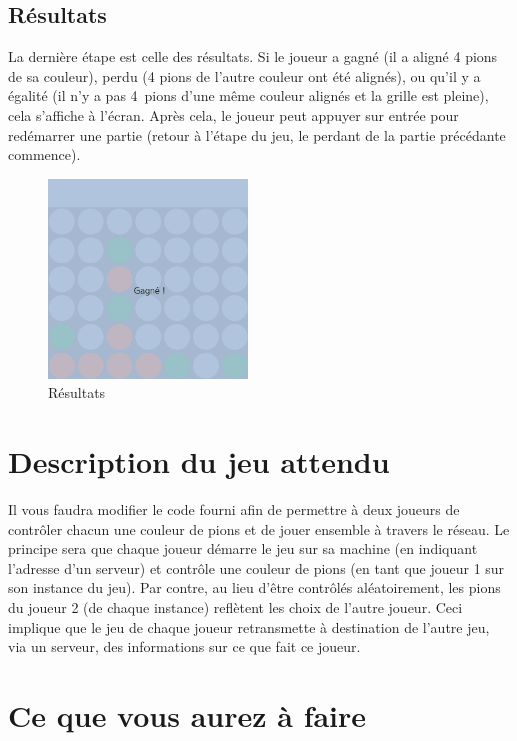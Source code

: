 \documentclass[a4paper]{article}
\begin{document}
\subsection{Résultats}

La dernière étape est celle des résultats.
Si le joueur a gagné (il a aligné 4 pions de sa couleur), perdu (4 pions de l'autre couleur ont été alignés), ou qu'il y a égalité (il n'y a pas 4 pions d'une même couleur alignés et la grille est pleine), cela s'affiche à l'écran.
Après cela, le joueur peut appuyer sur entrée pour redémarrer une partie (retour à l'étape du jeu, le perdant de la partie précédante commence).

\begin{figure}[htbp]
  \centering
  \includegraphics[width=150pt]{results.png}
  \caption{Résultats}\label{fig:resultats}
\end{figure}

\section{Description du jeu attendu}
\label{section:todo}

Il vous faudra modifier le code fourni afin de permettre à deux joueurs de contrôler chacun une couleur de pions et de jouer ensemble à travers le réseau.
Le principe sera que chaque joueur démarre le jeu sur sa machine (en indiquant l'adresse d'un serveur) et contrôle une couleur de pions (en tant que joueur 1 sur son instance du jeu).
Par contre, au lieu d'être contrôlés aléatoirement, les pions du joueur 2 (de chaque instance) reflètent les choix de l'autre joueur.
Ceci implique que le jeu de chaque joueur retransmette à destination de l'autre jeu, via un serveur, des informations sur ce que fait ce joueur.

\section{Ce que vous aurez à faire}
\end{document}
